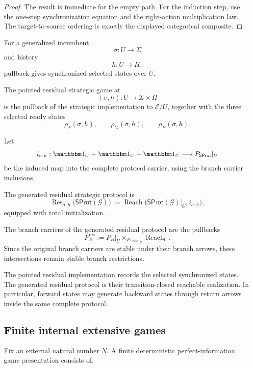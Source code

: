 \begin{proof}
The result is immediate for the empty path. For the induction step, use the one-step synchronization
equation and the right-action multiplication law. The target-to-source ordering is exactly the
displayed categorical composite.
\end{proof}

For a generalized incumbent
\[
  \sigma:U\to\Sigma
\]
and history
\[
  h:U\to H,
\]
pullback gives synchronized selected states over \(U\).

\begin{definition}
\label{def:residual-strategic-game}
The pointed residual strategic game at
\[
  (\sigma,h):U\to\Sigma\times H
\]
is the pullback of the strategic implementation to \(\mathcal E/U\), together with the three
selected ready states
\[
  \rho_F(\sigma,h),
  \qquad
  \rho_G(\sigma,h),
  \qquad
  \rho_E(\sigma,h).
\]

Let
\[
  i_{\sigma,h}:
  \mathbbm1_U+\mathbbm1_U+\mathbbm1_U
  \longrightarrow
  P_{\mathsf{SProt}}|_U
\]
be the induced map into the complete protocol carrier, using the branch carrier inclusions.

The generated residual strategic protocol is
\[
  \operatorname{Res}_{\sigma,h}
  \bigl(
    \mathsf{SProt}(\mathcal G)
  \bigr)
  :=
  \operatorname{Reach}
  \bigl(
    \mathsf{SProt}(\mathcal G)|_U,
    i_{\sigma,h}
  \bigr),
\]
equipped with total initialization.
\end{definition}

The branch carriers of the generated residual protocol are the pullbacks
\[
  P_B^{\mathrm{res}}
  :=
  P_B|_U
  \times_{P_{\mathsf{SProt}}|_U}
  \operatorname{Reach}_0.
\]
Since the original branch carriers are stable under their branch arrows, these intersections remain
stable branch restrictions.

The pointed residual implementation records the selected synchronized states. The generated residual
protocol is their transition-closed reachable realization. In particular, forward states may
generate backward states through return arrows inside the same complete protocol.

\subsection{Finite internal extensive games}

Fix an external natural number \(N\). A finite deterministic perfect-information game presentation
consists of:

